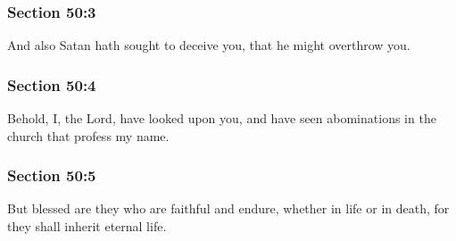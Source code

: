 
	\subsubsection{Section 50:3} %
		\label{DC50-3}

		And also Satan hath sought to deceive you, that he might overthrow you.


	\subsubsection{Section 50:4} %
		\label{DC50-4}

		Behold, I, the Lord, have looked upon you, and have seen abominations in the church that profess my name.


	\subsubsection{Section 50:5} %
		\label{DC50-5}

		But blessed are they who are faithful and endure, whether in life or in death, for they shall inherit eternal life.

